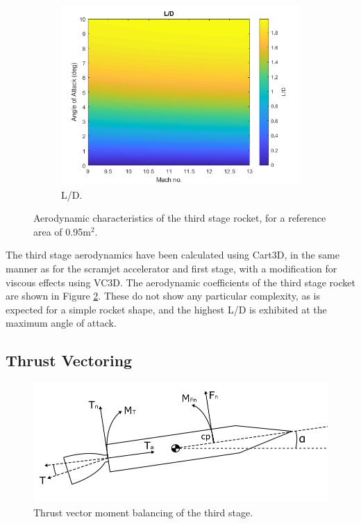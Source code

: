 \begin{figure}[ht]
\begin{subfigure}{.5\textwidth}
					\includegraphics[width=0.99\linewidth]{figures/3_vehicle_design/ThirdStageLD}
					\caption{L/D.}
					\label{fig:LD-ThirdStage}
				\end{subfigure}
				\caption{Aerodynamic characteristics of the third stage rocket, for a reference area of 0.95m$^2$.} %
				\label{fig:ThirdStageAero}
			\end{figure}
			The third stage aerodynamics have been calculated using Cart3D, in the same manner as for the  scramjet accelerator and first stage, with a modification for viscous effects using VC3D.
		The aerodynamic coefficients of the third stage rocket are shown in Figure \ref{fig:ThirdStageAero}. These do not show any particular complexity, as is expected for a simple rocket shape, and the highest L/D is exhibited at the maximum angle of attack. 
		
	
		
		
		
		\subsection{Thrust Vectoring}\label{sec:thrustvectoring}
		\begin{figure}[ht]
			\centering
			\includegraphics[width=0.7\linewidth]{figures/3_vehicle_design/ThrustVec}
			\caption{Thrust vector moment balancing of the third stage.}
			\label{fig:ThrustVec}
		\end{figure}
		
